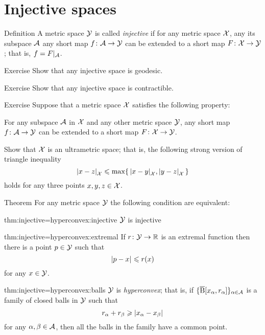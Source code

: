 \section{Injective spaces}

\begin{thm}{Definition}\label{def:injective}
A metric space $\mathcal{Y}$ is called \emph{injective} if for any metric space $\mathcal{X}$,
any its subspace $\mathcal{A}$
any short map $f\colon\mathcal{A}\to \mathcal{Y}$ can be extended to a short map $F\colon\mathcal{X}\to \mathcal{Y}$;
that is, $f=F|_{\mathcal{A}}$.
\end{thm}

\begin{thm}{Exercise}
Show that any injective space is geodesic.
\end{thm}

\begin{thm}{Exercise}
Show that any injective space is contractible.
\end{thm}

\begin{thm}{Exercise}\label{ex:ultrametric}
Suppose that a metric space $\mathcal{X}$ satisfies the following property:

For any subspace $\mathcal{A}$ in $\mathcal{X}$ and any other metric space $\mathcal{Y}$, any short map $f\colon\mathcal{A}\to \mathcal{Y}$ can be extended to a short map $F\colon\mathcal{X}\to \mathcal{Y}$.

Show that $\mathcal{X}$ is an ultrametric space;
that is, the following strong version of triangle inequality
\[\dist{x}{z}{\spc{X}}
\le
\max\{\,\dist{x}{y}{\spc{X}},\dist{y}{z}{\spc{X}}\,\}\]
holds for any three points $x,y,z\in \mathcal{X}$.
\end{thm}

\begin{thm}{Theorem}\label{thm:injective=hyperconvex}
For any metric space $\mathcal{Y}$ the following condition are equivalent:

\begin{subthm}{thm:injective=hyperconvex:injective}
$\mathcal{Y}$ is injective
\end{subthm}


\begin{subthm}{thm:injective=hyperconvex:extremal}
If $r\colon\mathcal{Y}\to\mathbb{R}$ is an extremal function then there is a point $p\in \mathcal{Y}$ such that 
\[\dist{p}{x}{}\le r(x)\]
for any $x\in \mathcal{Y}$.
\end{subthm}

\begin{subthm}{thm:injective=hyperconvex:balls}
$\mathcal{Y}$ is \emph{hyperconvex};
that is, if $\{\overline{\mathrm{B}}{}[x_\alpha,r_\alpha]\}_{\alpha\in\mathcal{A}}$ is a family of closed balls in $\mathcal{Y}$ such that 
 \[r_\alpha+r_\beta\ge \dist{x_\alpha}{x_\beta}{}\]
 for any $\alpha,\beta\in \mathcal{A}$,
then all the balls in the family have a common point.
\end{subthm}

\end{thm}

